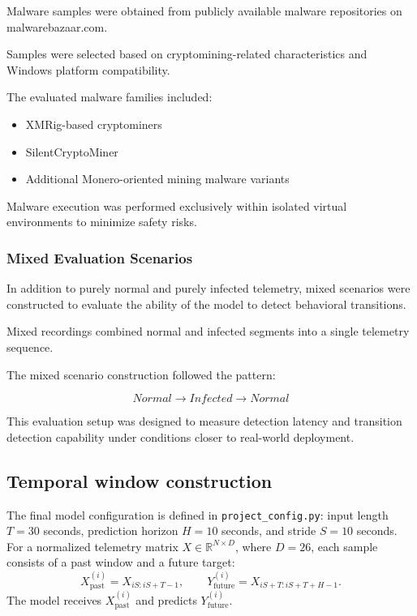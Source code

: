 \documentclass[a4paper,12pt]{extarticle}
\begin{document}
Malware samples were obtained from publicly available malware repositories on malwarebazaar.com.

Samples were selected based on cryptomining-related characteristics and Windows platform compatibility.

The evaluated malware families included:

\begin{itemize}
    \item XMRig-based cryptominers
    \item SilentCryptoMiner
    \item Additional Monero-oriented mining malware variants
\end{itemize}

Malware execution was performed exclusively within isolated virtual environments to minimize safety risks.

\subsubsection{Mixed Evaluation Scenarios}

In addition to purely normal and purely infected telemetry, mixed scenarios were constructed to evaluate the ability of the model to detect behavioral transitions.

Mixed recordings combined normal and infected segments into a single telemetry sequence.

The mixed scenario construction followed the pattern:

\begin{equation}
Normal \rightarrow Infected \rightarrow Normal
\end{equation}

This evaluation setup was designed to measure detection latency and transition detection capability under conditions closer to real-world deployment.

\subsection{Temporal window construction}

The final model configuration is defined in \texttt{project\_config.py}: input length $T=30$ seconds, prediction horizon $H=10$ seconds, and stride $S=10$ seconds. For a normalized telemetry matrix $X \in \mathbb{R}^{N \times D}$, where $D=26$, each sample consists of a past window and a future target:
\begin{equation}
    X_{\mathrm{past}}^{(i)} = X_{iS:iS+T-1}, \qquad
    Y_{\mathrm{future}}^{(i)} = X_{iS+T:iS+T+H-1}.
    \label{eq:window}
\end{equation}
The model receives $X_{\mathrm{past}}^{(i)}$ and predicts $Y_{\mathrm{future}}^{(i)}$.
\end{document}
